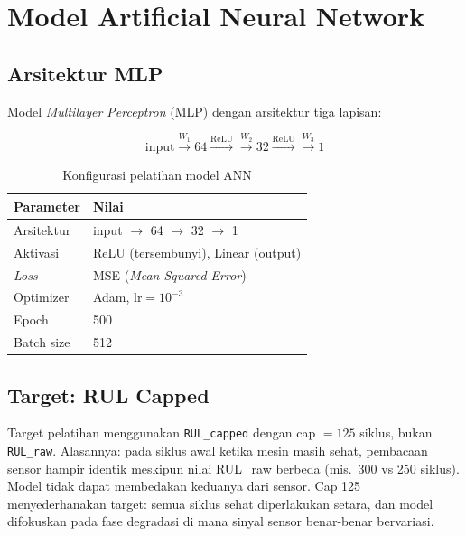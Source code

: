 \documentclass[11pt,a4paper]{article}
\begin{document}
\section{Model Artificial Neural Network}

\subsection{Arsitektur MLP}

Model \textit{Multilayer Perceptron} (MLP) dengan arsitektur tiga lapisan:

\begin{equation}
  \text{input} \xrightarrow{W_1} 64 \xrightarrow{\text{ReLU}}
  \xrightarrow{W_2} 32 \xrightarrow{\text{ReLU}}
  \xrightarrow{W_3} 1
\end{equation}

\begin{table}[H]
\centering\small
\caption{Konfigurasi pelatihan model ANN}
\label{tab:ann_config}
\begin{tabular}{ll}
\toprule
Parameter & Nilai \\
\midrule
Arsitektur    & input $\to$ 64 $\to$ 32 $\to$ 1 \\
Aktivasi      & ReLU (tersembunyi), Linear (output) \\
\textit{Loss} & MSE (\textit{Mean Squared Error}) \\
Optimizer     & Adam, $\text{lr} = 10^{-3}$ \\
Epoch         & 500 \\
Batch size    & 512 \\
\bottomrule
\end{tabular}
\end{table}

\subsection{Target: RUL Capped}

Target pelatihan menggunakan \texttt{RUL\_capped} dengan cap $= 125$ siklus,
bukan \texttt{RUL\_raw}. Alasannya: pada siklus awal ketika mesin masih sehat,
pembacaan sensor hampir identik meskipun nilai RUL\_raw berbeda (mis.\ 300 vs
250 siklus). Model tidak dapat membedakan keduanya dari sensor. Cap 125
menyederhanakan target: semua siklus sehat diperlakukan setara, dan model
difokuskan pada fase degradasi di mana sinyal sensor benar-benar bervariasi.
\end{document}
